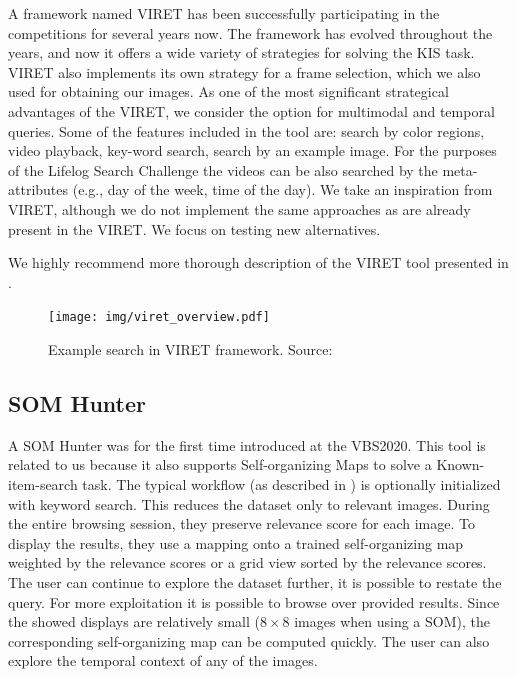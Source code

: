 A framework named VIRET \citep{lokovc2019framework, lokovc2019viret} has been successfully participating in the competitions for several years now. The framework has evolved throughout the years, and now it offers a wide variety of strategies for solving the KIS task. VIRET also implements its own strategy for a frame selection, which we also used for obtaining our images. As one of the most significant strategical advantages of the VIRET, we consider the option for multimodal and temporal queries. Some of the features included in the tool are: search by color regions, video playback, key-word search, search by an example image. For the purposes of the Lifelog Search Challenge \citep{LSC20} the videos can be also searched by the meta-attributes (e.g., day of the week, time of the day). We take an inspiration from VIRET, although we do not implement the same approaches as are already present in the VIRET. We focus on testing new alternatives.

We highly recommend more thorough description of the VIRET tool presented in \cite{kovalvcik2020viret}.

\begin{figure}
    \centering
    \texttt{[image: img/viret\_overview.pdf]}
    \caption{Example search in VIRET framework. Source: \cite{kovalvcik2020viret}}
    \label{fig:viret}
\end{figure}

\subsection{SOM Hunter}

A SOM Hunter was for the first time introduced at the VBS2020. This tool is related to us because it also supports Self-organizing Maps to solve a Known-item-search task. The typical workflow (as described in \cite{kratochvil2020som}) is optionally initialized with keyword search. This reduces the dataset only to relevant images. During the entire browsing session, they preserve relevance score for each image. To display the results, they use a mapping onto a trained self-organizing map weighted by the relevance scores or a grid view sorted by the relevance scores. The user can continue to explore the dataset further, it is possible to restate the query. For more exploitation it is possible to browse over provided results. Since the showed displays are relatively small ($8\times8$ images when using a SOM), the corresponding self-organizing map can be computed quickly. The user can also explore the temporal context of any of the images.


